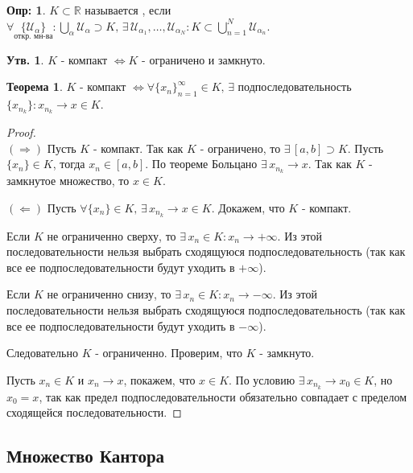 \documentclass[12pt]{article}
\theoremstyle{definition}
\newtheorem{defn}{Опр:}
\newtheorem{prop}{Утв.}
\newtheorem{theorem}{Теорема}
\begin{document}
	
\begin{defn}
	 $K \subset \mathbb{R}$ называется , если $\forall \! \underset{\text{откр. мн-ва}}{\{\mathcal{U}_\alpha\}} \colon \bigcup\limits_\alpha \mathcal{U}_{\alpha} \supset K, \, \exists \, \mathcal{U}_{\alpha_1}, \dotsc, \mathcal{U}_{\alpha_N} \colon K \subset \bigcup\limits_{n = 1}^{N} \mathcal{U}_{\alpha_n}$.
\end{defn}
	
\begin{prop}
	$K$ - компакт $\Leftrightarrow K$ - ограничено и замкнуто. 
\end{prop}
	
\begin{theorem}
	$K$ - компакт $\Leftrightarrow \forall \{x_n\}_{n=1}^{\infty} \in K, \,\exists$ подпоследовательность $\{x_{n_k}\} \colon x_{n_k} \to x \in K$.
\end{theorem}
	
\begin{proof}\hfill\\
	$(\Rightarrow)$ Пусть $K$ - компакт. Так как $K$ - ограничено, то $\exists \, [a,b] \supset K$. Пусть $\{x_n\} \in K$, тогда $x_n \in [a,b]$. По теореме Больцано $\exists \, x_{n_k} \to x$. Так как $K$ - замкнутое множество, то $x \in K$.
	
	$(\Leftarrow)$ Пусть $\forall \{x_n\}\in K, \,\exists \, x_{n_k} \to x \in K$. Докажем, что $K$ - компакт. 
	
	Если $K$ не ограниченно сверху, то $\exists \, x_n \in K \colon x_n \to +\infty$. Из этой последовательности нельзя выбрать сходящуюся подпоследовательность (так как все ее подпоследовательности будут уходить в $+\infty$).
	
	Если $K$ не ограниченно снизу, то $\exists \, x_n \in K \colon x_n \to -\infty$. Из этой последовательности нельзя выбрать сходящуюся подпоследовательность (так как все ее подпоследовательности будут уходить в $-\infty$).
	
	Следовательно $K$ - ограниченно. Проверим, что $K$ - замкнуто.
	
	Пусть $x_n \in K$ и $x_n \to x$, покажем, что $x \in K$. По условию $\exists \, x_{n_k} \to x_0 \in K$, но $x_0 = x$, так как предел подпоследовательности обязательно совпадает с пределом сходящейся последовательности.
\end{proof}

\subsection*{Множество Кантора}
\end{document}
